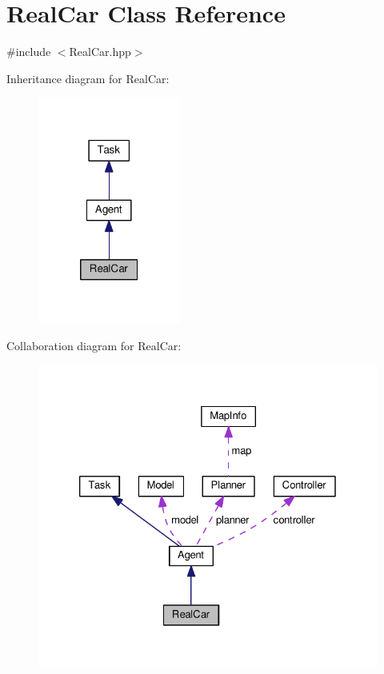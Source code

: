 \hypertarget{classRealCar}{}\section{Real\+Car Class Reference}
\label{classRealCar}


{\ttfamily \#include $<$Real\+Car.\+hpp$>$}



Inheritance diagram for Real\+Car\+:\nopagebreak
\begin{figure}[H]
\begin{center}
\leavevmode
\includegraphics[width=133pt]{classRealCar__inherit__graph}
\end{center}
\end{figure}


Collaboration diagram for Real\+Car\+:\nopagebreak
\begin{figure}[H]
\begin{center}
\leavevmode
\includegraphics[width=326pt]{classRealCar__coll__graph}
\end{center}
\end{figure}
